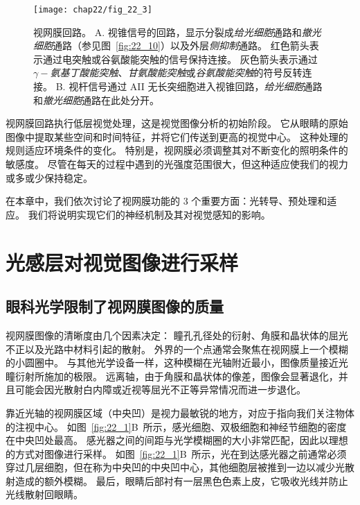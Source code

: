 \begin{figure}[htbp]
	\centering
	\texttt{[image: chap22/fig\_22\_3]}
	\caption{视网膜回路。
		A. 视锥信号的回路，显示分裂成\textit{给光细胞}通路和\textit{撤光细胞}通路（参见图~\ref{fig:22_10}）以及外层\textit{侧抑制}通路。
		红色箭头表示通过电突触或谷氨酸能突触的信号保持连接。
		灰色箭头表示通过\textit{$\gamma-$氨基丁酸能突触}、\textit{甘氨酸能突触}或\textit{谷氨酸能突触}的符号反转连接。
		B. 视杆信号通过 AII 无长突细胞进入视锥回路，\textit{给光细胞}通路和\textit{撤光细胞}通路在此处分开。}
	\label{fig:22_3}
\end{figure}


视网膜回路执行低层视觉处理，这是视觉图像分析的初始阶段。
它从眼睛的原始图像中提取某些空间和时间特征，并将它们传送到更高的视觉中心。
这种处理的规则适应环境条件的变化。
特别是，视网膜必须调整其对不断变化的照明条件的敏感度。
尽管在每天的过程中遇到的光强度范围很大，但这种适应使我们的视力或多或少保持稳定。


在本章中，我们依次讨论了视网膜功能的 3 个重要方面：光转导、预处理和适应。
我们将说明实现它们的神经机制及其对视觉感知的影响。



\section{光感层对视觉图像进行采样}

\subsection{眼科光学限制了视网膜图像的质量}

视网膜图像的清晰度由几个因素决定：
瞳孔孔径处的衍射、角膜和晶状体的屈光不正以及光路中材料引起的散射。
外界的一个点通常会聚焦在视网膜上一个模糊的小圆圈中。
与其他光学设备一样，这种模糊在光轴附近最小，图像质量接近光瞳衍射所施加的极限。
远离轴，由于角膜和晶状体的像差，图像会显著退化，并且可能会因光散射白内障或近视等屈光不正等异常情况而进一步退化。


靠近光轴的视网膜区域（中央凹）是视力最敏锐的地方，对应于指向我们关注物体的注视中心。
如图~\ref{fig:22_1}B~所示，感光细胞、双极细胞和神经节细胞的密度在中央凹处最高。
感光器之间的间距与光学模糊圈的大小非常匹配，因此以理想的方式对图像进行采样。
如图~\ref{fig:22_1}B~所示，光在到达感光器之前通常必须穿过几层细胞，但在称为中央凹的中央凹中心，其他细胞层被推到一边以减少光散射造成的额外模糊。
最后，眼睛后部衬有一层黑色色素上皮，它吸收光线并防止光线散射回眼睛。


